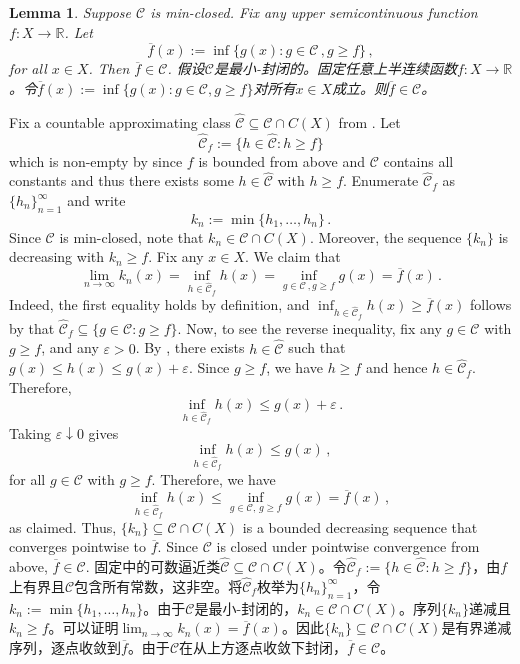 \documentclass[12pt,letterpaper]{article}
\makeatletter
\newenvironment{original}{\color{black}}{}
\newenvironment{translation}{\color{blue}}{}
\theoremstyle{plain}
\newtheorem{lemma}{Lemma}
\theoremstyle{definition}
\renewenvironment{proof}[1][\proofname]{
  \par\pushQED{\qed}\normalfont
  \topsep6\p@\@plus6\p@\relax
  \trivlist\item[\hskip\labelsep\bfseries#1\@addpunct{.}]
  \ignorespaces
}{
  \popQED\endtrivlist\@endpefalse
}
\theoremstyle{remark}
\newcommand{\C}{\mathcal{C}}
\newcommand{\R}{\mathds{R}}
\theoremstyle{definition}
\makeatother
\begin{document}
\begin{lemma}\label{lem:envelope}
\begin{original}
Suppose $\C$ is min-closed. Fix any upper semicontinuous function $f:X \to \R$. Let
\[
\overline{f}(x):=\inf \Big\{g(x): g \in \C\,, g \geq f\Big\}\,,
\]
for all $x \in X$. Then $\overline{f} \in \C$.
\end{original}
\begin{translation}
假设$\C$是最小-封闭的。固定任意上半连续函数$f:X \to \R$。令$\overline{f}(x):=\inf \{g(x): g \in \C, g \geq f\}$对所有$x \in X$成立。则$\overline{f} \in \C$。
\end{translation}
\end{lemma}

\begin{proof}
\begin{original}
Fix a countable approximating class $\widehat{\C} \subseteq \C \cap C(X)$ from . Let
\[\widehat{\C}_f := \Big\{h \in \widehat{\C}: h \geq f\Big\}\]
which is non-empty by  since $f$ is bounded from above and $\C$ contains all constants and thus there exists some $h \in \widehat{\C}$ with $h \geq f$. Enumerate $\widehat{\C}_f$ as $\{h_n\}_{n=1}^\infty$ and write
\[k_n := \min\{h_1, \dots, h_n\}\,.\]
Since $\C$ is min-closed, note that $k_n \in \C \cap C(X)$. Moreover, the sequence $\{k_n\}$ is decreasing with $k_n \geq f$. Fix any $x \in X$. We claim that
\[\lim_{n \rightarrow \infty} k_n(x) = \inf_{h \in \widehat{\C}_f} h(x) = \inf_{g \in \C\,, g \geq f} g(x) = \overline{f}(x)\,.\]
Indeed, the first equality holds by definition, and $\inf_{h \in \widehat{\C}_f} h(x) \geq \overline{f}(x)$ follows by that $\widehat{\C}_f \subseteq \{g \in \C: g \geq f\}$. Now, to see the reverse inequality, fix any $g \in \C$ with $g \geq f$, and any $\varepsilon > 0$. By , there exists $h \in \widehat{\C}$ such that $g(x) \leq h(x) \leq g(x) + \varepsilon$. Since $g \geq f$, we have $h \geq f$ and hence $h \in \widehat{\C}_f$. Therefore,
\[\inf_{h \in \widehat{\C}_f} h(x) \leq g(x) + \varepsilon\,.\]
Taking $\varepsilon \downarrow 0$ gives
\[\inf_{h \in \widehat{\C}_f} h(x) \leq g(x)\,,\]
for all $g \in \C$ with $g \geq f$. Therefore, we have
\[\inf_{h \in \widehat{\C}_f} h(x) \leq \inf_{g \in \C,\, g \geq f} g(x) = \overline{f}(x)\,,\]
as claimed. Thus, $\{k_n\} \subseteq \C \cap C(X)$ is a bounded decreasing sequence that converges pointwise to $\overline{f}$. Since $\C$ is closed under pointwise convergence from above, $\overline{f} \in \C$.
\end{original}
\begin{translation}
固定中的可数逼近类$\widehat{\C} \subseteq \C \cap C(X)$。令$\widehat{\C}_f := \{h \in \widehat{\C}: h \geq f\}$，由$f$上有界且$\C$包含所有常数，这非空。将$\widehat{\C}_f$枚举为$\{h_n\}_{n=1}^\infty$，令$k_n := \min\{h_1, \dots, h_n\}$。由于$\C$是最小-封闭的，$k_n \in \C \cap C(X)$。序列$\{k_n\}$递减且$k_n \geq f$。可以证明$\lim_{n \rightarrow \infty} k_n(x) = \overline{f}(x)$。因此$\{k_n\} \subseteq \C \cap C(X)$是有界递减序列，逐点收敛到$\overline{f}$。由于$\C$在从上方逐点收敛下封闭，$\overline{f} \in \C$。
\end{translation}
\end{proof}
\end{document}
